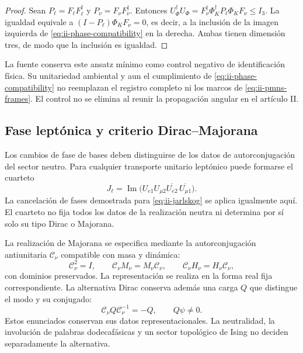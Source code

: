 \begin{proof}
Sean \(P_\ell=F_\ell F_\ell^\dagger\) y
\(P_\nu=F_\nu F_\nu^\dagger\). Entonces
\(U_\Phi^\dagger U_\Phi
=F_\nu^\dagger\Phi_K^\dagger P_\ell\Phi_KF_\nu\le I_3\).
La igualdad equivale a
\((I-P_\ell)\Phi_KF_\nu=0\), es decir, a la inclusión de la
imagen izquierda de \eqref{eq:ii-phase-compatibility} en la derecha.
Ambas tienen dimensión tres, de modo que la inclusión es igualdad.
\end{proof}

La fuente \cite{mezcla} conserva este ansatz mínimo como control
negativo de identificación física. Su unitariedad ambiental y aun el
cumplimiento de \eqref{eq:ii-phase-compatibility} no reemplazan el
registro completo ni los marcos de \eqref{eq:ii-pmns-frames}. El
control no se elimina al reunir la propagación angular en el artículo II.

\begingroup\fontsize{10}{11.7}\selectfont
\setlength{\parskip}{2pt}\setlength{\abovedisplayskip}{5pt}\setlength{\belowdisplayskip}{5pt}
\subsection{Fase leptónica y criterio Dirac--Majorana}

Los cambios de fase de bases deben distinguirse de los datos de
autorconjugación del sector neutro. Para cualquier transporte unitario
leptónico puede formarse el cuarteto
\begin{equation}
 J_\ell=\operatorname{Im}
 \bigl(U_{e1}U_{\mu2}\overline{U_{e2}}\,
                        \overline{U_{\mu1}}\bigr).
 \label{eq:ii-leptonic-quartet}
\end{equation}
La cancelación de fases demostrada para \eqref{eq:ii-jarlskog} se
aplica igualmente aquí. El cuarteto no fija todos los datos de la
realización neutra ni determina por sí solo su tipo Dirac o Majorana.

La realización de Majorana se especifica mediante la
autorconjugación antiunitaria \(\mathcal C_\nu\) compatible con masa y
dinámica:
\begin{equation}
 \mathcal C_\nu^2=I,\qquad
 \mathcal C_\nu M_\nu=M_\nu\mathcal C_\nu,\qquad
 \mathcal C_\nu H_\nu=H_\nu\mathcal C_\nu,
 \label{eq:ii-majorana-compatibility}
\end{equation}
con dominios preservados. La representación se realiza en la forma real
fija correspondiente. La alternativa Dirac conserva además una carga
\(Q\) que distingue el modo y su conjugado:
\begin{equation}
 \mathcal C_\nu Q\mathcal C_\nu^{-1}=-Q,\qquad Q\psi\ne0.
 \label{eq:ii-dirac-charge}
\end{equation}
Estos enunciados conservan sus datos representacionales. La neutralidad,
la involución de palabras dodecafásicas y un sector topológico de Ising
no deciden separadamente la alternativa.

